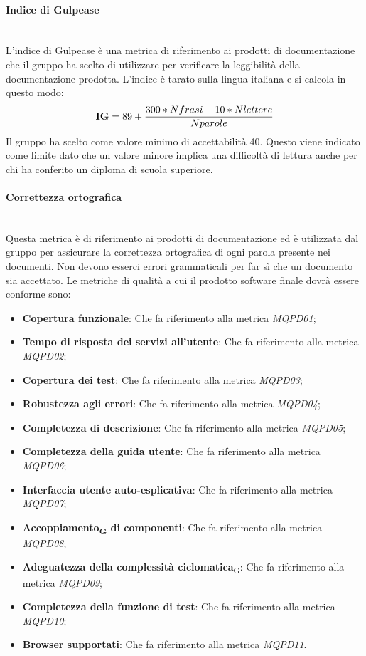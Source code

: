 \paragraph{Indice di Gulpease}\mbox{}\\
L'indice di Gulpease è una metrica di riferimento ai prodotti di documentazione che il gruppo ha scelto di utilizzare per verificare la leggibilità della documentazione prodotta. L'indice è tarato sulla lingua italiana e si calcola in questo modo:
\begin{align*}
	\centering
	\textbf{IG} = 89 + \frac{300 * Nfrasi - 10 * Nlettere}{Nparole}
\end{align*}
Il gruppo ha scelto come valore minimo di accettabilità 40. Questo viene indicato come limite dato che un valore minore implica una difficoltà di lettura anche per chi ha conferito un diploma di scuola superiore.
\paragraph{Correttezza ortografica}\mbox{}\\
Questa metrica è di riferimento ai prodotti di documentazione ed è utilizzata dal gruppo per assicurare la correttezza ortografica di ogni parola presente nei documenti. Non devono esserci errori grammaticali per far sì che un documento sia accettato.
Le metriche di qualità a cui il prodotto software finale dovrà essere conforme sono:
\begin{itemize}
	\item \textbf{Copertura funzionale}: Che fa riferimento alla metrica \textit{MQPD01};
	\item \textbf{Tempo di risposta dei servizi all'utente}: Che fa riferimento alla metrica \textit{MQPD02};
	\item \textbf{Copertura dei test}: Che fa riferimento alla metrica \textit{MQPD03};
	\item \textbf{Robustezza agli errori}: Che fa riferimento alla metrica \textit{MQPD04};
	\item \textbf{Completezza di descrizione}: Che fa riferimento alla metrica \textit{MQPD05};
	\item \textbf{Completezza della guida utente}: Che fa riferimento alla metrica \textit{MQPD06};
	\item \textbf{Interfaccia utente auto-esplicativa}: Che fa riferimento alla metrica \textit{MQPD07};
	\item \textbf{Accoppiamento\textsubscript{G} di componenti}: Che fa riferimento alla metrica \textit{MQPD08};
	\item \textbf{Adeguatezza della complessità ciclomatica}\textsubscript{G}: Che fa riferimento alla metrica \textit{MQPD09};
	\item \textbf{Completezza della funzione di test}: Che fa riferimento alla metrica \textit{MQPD10};
	\item \textbf{Browser supportati}: Che fa riferimento alla metrica \textit{MQPD11}.
\end{itemize}
